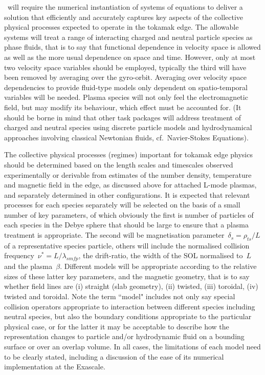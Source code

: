 \nep \  will require the numerical instantiation of systems of equations to deliver
a solution that efficiently and accurately captures
key aspects of the collective physical processes expected to 
operate in the tokamak edge. The allowable systems will treat a range of 
interacting charged and neutral particle species as phase fluids, that is to 
say that functional dependence in velocity space is allowed as well as the more 
usual dependence on space and time. However, only at most two velocity space 
variables should be employed, typically the third will have been removed by 
averaging over the gyro-orbit. Averaging over velocity space 
dependencies to provide fluid-type models only dependent on spatio-temporal variables will be needed.
Plasma species will not only feel the electromagnetic 
field, but may modify its behaviour, which effect must be accounted for. (It 
should be borne in mind that other task packages will address treatment of 
charged and neutral species using discrete particle models and hydrodynamical approaches
involving classical Newtonian fluids, cf.\ Navier-Stokes Equations).

The collective physical processes (regimes) important 
for tokamak edge physics should be determined based on the length scales and timescales observed 
experimentally or derivable from estimates of the number density, temperature 
and magnetic field in the edge, as discussed above for attached L-mode plasmas, and separately
determined in other configurations. It is expected that 
relevant processes for each species separately will be selected on the basis of 
a small number of key parameters, of which obviously the first is number 
of particles of each species in the Debye sphere that should be large to ensure that a plasma 
treatment is appropriate. The second will be magnetisation parameter~$\delta_s=\rho_{ts}/L$ of a 
representative species particle, others will include the normalised collision 
frequency~$\nu^{*}=L/\lambda_{smfp}$, the drift-ratio, the
width of the SOL normalised to~$L$ and the plasma~$\beta$.
Different models will be appropriate according 
to the relative sizes of these latter key parameters, and the magnetic 
geometry, that is to say whether field lines are (i) straight (slab 
geometry), (ii) twisted, (iii) toroidal, (iv) twisted and toroidal. Note the 
term ``model" includes not only say special collision operators appropriate 
to interaction between different species including neutral species, but also 
the boundary conditions appropriate to the particular physical case, or for the 
latter it may be acceptable to describe how the representation changes to 
particle and/or hydrodynamic fluid on a bounding surface or over an overlap 
volume. In all cases, the limitations of each model need to be clearly stated, including a 
discussion of the ease of its numerical implementation at the Exascale.

